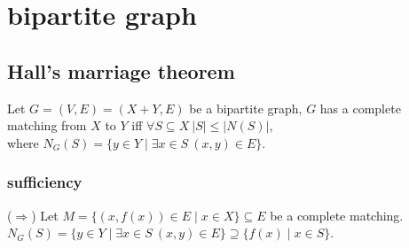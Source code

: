 \documentclass{article}
\begin{document}
\tableofcontents

\newpage

\section{bipartite graph}

\subsection{Hall's marriage theorem}
Let $G=(V,E)=(X+Y,E)$ be a bipartite graph, $G$ has a complete matching from $X$ to $Y$ iff $\forall S\subseteq X\ |S|\leq |N(S)|$,\\
where $N_G(S)=\{y\in Y\mid \exists x\in S\ (x,y)\in E\}$.

\subsubsection{sufficiency}
($\Rightarrow$)\quad
Let $M=\{(x,f(x))\in E\mid x\in X\}\subseteq E$ be a complete matching.\\
$N_G(S)=\{y\in Y\mid \exists x\in S\ (x,y)\in E\}\supseteq \{f(x)\mid x\in S\}$.
\end{document}
